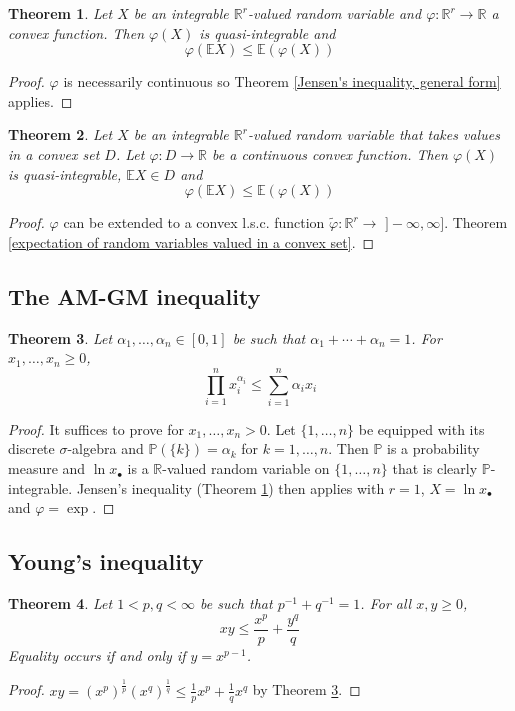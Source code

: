 \documentclass[11pt, a4paper, openany]{book}
\newtheorem{thm}{Theorem}\newtheorem{lem}{Lemma}\newtheorem{crl}{Corollary}
\theoremstyle{definition}
\begin{document}
    \begin{thm}\label{Jensen's inequality}
        Let $X$ be an integrable $\mathbb{R}^r$-valued random variable and $\varphi:\mathbb{R}^r\rightarrow \mathbb{R}$ a convex function. Then $\varphi(X)$ is quasi-integrable and
        \[
            \varphi(\mathbb{E}X)\leqslant \mathbb{E}(\varphi(X))
        \]
    \end{thm}
    \begin{proof}
        $\varphi$ is necessarily continuous so Theorem \ref{Jensen's inequality, general form} applies.
    \end{proof}
    \begin{thm}\label{Jensen's inequality, for continuous convex functions on a convex set}
        Let $X$ be an integrable $\mathbb{R}^r$-valued random variable that takes values in a convex set $D$. Let $\varphi:D\rightarrow \mathbb{R}$ be a continuous convex function. Then $\varphi(X)$ is quasi-integrable, $\mathbb{E}X\in D$ and
        \[
            \varphi(\mathbb{E}X)\leqslant \mathbb{E}(\varphi(X))
        \]
    \end{thm}
    \begin{proof}
        $\varphi$ can be extended to a convex l.s.c. function $\widetilde{\varphi}:\mathbb{R}^r\rightarrow \,\,]\!-\!\infty,\infty]$. Theorem \ref{expectation of random variables valued in a convex set}.
    \end{proof}
\subsection{The AM-GM inequality}
    \begin{thm}\label{AM-GM}
        Let $\alpha_1,\dots,\alpha_n\in[0,1]$ be such that $\alpha_1+\cdots+\alpha_n=1$. For $x_1,\dots,x_n\geqslant 0$,
        \[
            \prod_{i=1}^n x_i^{\alpha_i}\leqslant \sum_{i=1}^n\alpha_ix_i
        \]
    \end{thm}
    \begin{proof}
        It suffices to prove for $x_1,\dots,x_n>0$. Let $\{1,\dots,n\}$ be equipped with its discrete $\sigma$-algebra and $\mathbb{P}(\{k\})=\alpha_k$ for $k=1,\dots,n$. Then $\mathbb{P}$ is a probability measure and $\ln x_\bullet$ is a $\mathbb{R}$-valued random variable on $\{1,\dots,n\}$ that is clearly $\mathbb{P}$-integrable. Jensen's inequality (Theorem \ref{Jensen's inequality}) then applies with $r=1$, $X=\ln x_\bullet$ and $\varphi=\exp$.
    \end{proof}
\subsection{Young's inequality}
    \begin{thm}\label{Young's inequality}
        Let $1<p,q<\infty$ be such that $p^{-1}+q^{-1}=1$. For all $x,y\geqslant 0$,
        \[
            xy\leqslant \frac{x^p}{p}+\frac{y^q}{q}
        \]
        Equality occurs if and only if $y=x^{p-1}$.
    \end{thm}
    \begin{proof}
        $xy=(x^p)^{\frac{1}{p}}(x^q)^{\frac{1}{q}}\leqslant \frac{1}{p}x^p+\frac{1}{q}x^q$ by Theorem \ref{AM-GM}.
    \end{proof}
\end{document}

